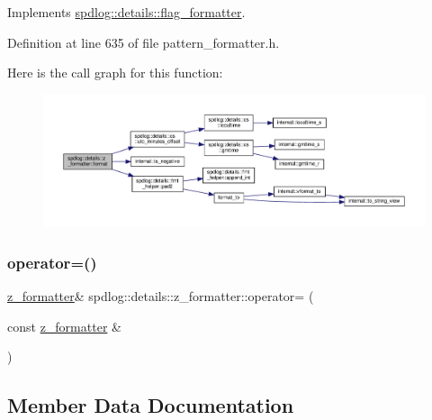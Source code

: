 Implements \hyperlink{classspdlog_1_1details_1_1flag__formatter_a33fb3e42a4c8200cceb833d92b53fb67}{spdlog\+::details\+::flag\+\_\+formatter}.



Definition at line 635 of file pattern\+\_\+formatter.\+h.

Here is the call graph for this function\+:
\nopagebreak
\begin{figure}[H]
\begin{center}
\leavevmode
\includegraphics[width=350pt]{classspdlog_1_1details_1_1z__formatter_ada7a5e9a3c30039cbfb684b7743b8945_cgraph}
\end{center}
\end{figure}
\mbox{\label{classspdlog_1_1details_1_1z__formatter_aea05e7a7a960bb9450b00aa9558e78fe}} 
\subsubsection{\texorpdfstring{operator=()}{operator=()}}
{\footnotesize\ttfamily \hyperlink{classspdlog_1_1details_1_1z__formatter}{z\+\_\+formatter}\& spdlog\+::details\+::z\+\_\+formatter\+::operator= (\begin{DoxyParamCaption}\item[{const \hyperlink{classspdlog_1_1details_1_1z__formatter}{z\+\_\+formatter} \&}]{ }\end{DoxyParamCaption})\hspace{0.3cm}{\ttfamily [delete]}}



\subsection{Member Data Documentation}
\mbox{\label{classspdlog_1_1details_1_1z__formatter_a804a8b5035af28939f4803033c951edc}} 
